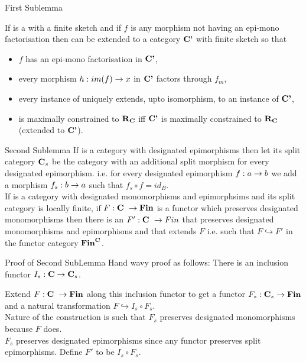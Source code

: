 \begin{frame}{First Sublemma}
\begin{lemma}
If \catcw is a \catMEterm with a finite sketch and if $f$ is any  morphism 
not having an epi-mono factorisation then \catcw can be extended to a category $\textbf{C'}$ with finite sketch so that
\begin{itemize} 
\item $f$ has an epi-mono factorisation \factorisationfdiagram in $\textbf{C'}$,
\item every morphism $h:im(f) \rightarrow x$ in $\textbf{C'}$ factors through $f_m$,
\item every instance of \catcw uniquely extends, upto isomorphism, to an instance of $\textbf{C'}$,
\item \catcw is maximally constrained to $\textbf{R}_{\textbf{C}}$ iff $\textbf{C'}$ is maximally constrained to $\textbf{R}_{\textbf{C}}$ (extended to $\textbf{C'}$).
\end{itemize} 
\end{lemma} 
\end{frame}

\begin{frame}{Second Sublemma}
If \catcw is a category with designated epimorphisms then let its split category 
$\textbf{C}_s$ be the category \catcw with an additional split morphism for every designated epimorphism.
i.e. for every designated epimorphism $f: a \rightarrow b$ we add a morphism $f_s:b \rightarrow a$
such that $f_s \circ f = id_B$. \\
\medskip
If \catcw is a category with designated monomorphisms and epimorphsims and its split category
is locally finite, if $F: \textbf{C}\  \rightarrow \textbf{Fin}$ is a functor which preserves designated monomorphisms
then there is an $F':\textbf{C}\  \rightarrow Fin$ that preserves designated monomorphisms and epimorphisms
and that extends $F$ i.e. such that $F \hookrightarrow F'$ in the functor category $\textbf{Fin}^{\textbf{C}}$.
\end{frame}

\begin{frame}{Proof of Second SubLemma}
Hand wavy proof as follows:
There is an inclusion functor $I_s:\textbf{C} \rightarrow \textbf{C}_s$.

Extend $F:\textbf{C}\  \rightarrow \textbf{Fin}$ along this inclusion functor  to get a functor 
$F_s:\textbf{C}_s \rightarrow \textbf{Fin}$ and a natural transformation $F \hookrightarrow I_s \circ F_s$. \\
\medskip
Nature of the construction is such that $F_s$ preserves designated monomorphisms because $F$ does.\\
\medskip
$F_s$ preserves designated epimorphisms since any functor preserves split epimorphisms.
Define $F'$ to be $I_s \circ F_s$.
\end{frame}

